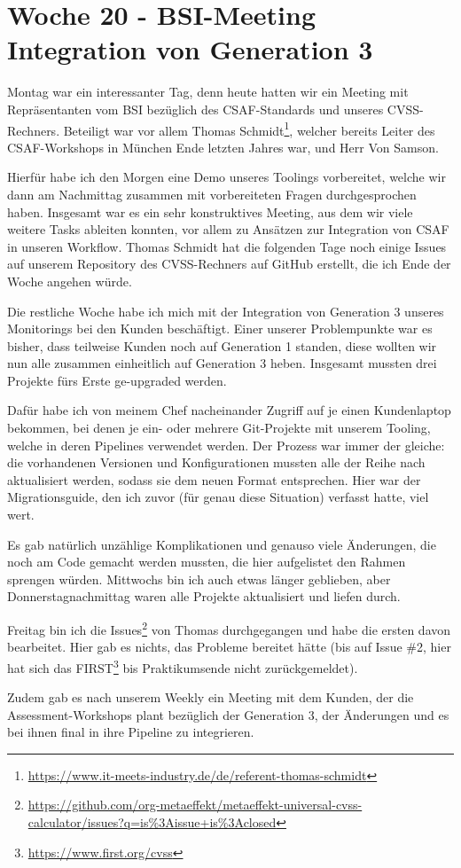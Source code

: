 \section{Woche 20 - BSI-Meeting \headerand Integration von Generation 3} \label{sec:bericht-wo-20}



Montag war ein interessanter Tag, denn heute hatten wir ein Meeting mit Repräsentanten vom BSI bezüglich des CSAF-Standards und unseres CVSS-Rechners.
Beteiligt war vor allem Thomas Schmidt\footnote{\url{https://www.it-meets-industry.de/de/referent-thomas-schmidt}}, welcher bereits Leiter des CSAF-Workshops in München Ende letzten Jahres war, und Herr Von Samson.

Hierfür habe ich den Morgen eine Demo unseres Toolings vorbereitet, welche wir dann am Nachmittag zusammen mit vorbereiteten Fragen durchgesprochen haben.
Insgesamt war es ein sehr konstruktives Meeting, aus dem wir viele weitere Tasks ableiten konnten, vor allem zu Ansätzen zur Integration von CSAF in unseren Workflow.
Thomas Schmidt hat die folgenden Tage noch einige Issues auf unserem Repository des CVSS-Rechners auf GitHub erstellt, die ich Ende der Woche angehen würde.


Die restliche Woche habe ich mich mit der Integration von Generation 3 unseres Monitorings bei den Kunden beschäftigt.
Einer unserer Problempunkte war es bisher, dass teilweise Kunden noch auf Generation 1 standen, diese wollten wir nun alle zusammen einheitlich auf Generation 3 heben.
Insgesamt mussten drei Projekte fürs Erste ge-upgraded werden.

Dafür habe ich von meinem Chef nacheinander Zugriff auf je einen Kundenlaptop bekommen, bei denen je ein- oder mehrere Git-Projekte mit unserem Tooling, welche in deren Pipelines verwendet werden.
Der Prozess war immer der gleiche:
die vorhandenen Versionen und Konfigurationen mussten alle der Reihe nach aktualisiert werden, sodass sie dem neuen Format entsprechen.
Hier war der Migrationsguide, den ich zuvor (für genau diese Situation) verfasst hatte, viel wert.

Es gab natürlich unzählige Komplikationen und genauso viele Änderungen, die noch am Code gemacht werden mussten, die hier aufgelistet den Rahmen sprengen würden.
Mittwochs bin ich auch etwas länger geblieben, aber Donnerstagnachmittag waren alle Projekte aktualisiert und liefen durch.


Freitag bin ich die Issues\footnote{\url{https://github.com/org-metaeffekt/metaeffekt-universal-cvss-calculator/issues?q=is\%3Aissue+is\%3Aclosed}} von Thomas durchgegangen und habe die ersten davon bearbeitet.
Hier gab es nichts, das Probleme bereitet hätte (bis auf Issue \#2, hier hat sich das FIRST\footnote{\url{https://www.first.org/cvss}} bis Praktikumsende nicht zurückgemeldet).

Zudem gab es nach unserem Weekly ein Meeting mit dem Kunden, der die Assessment-Workshops plant bezüglich der Generation 3, der Änderungen und es bei ihnen final in ihre Pipeline zu integrieren.

